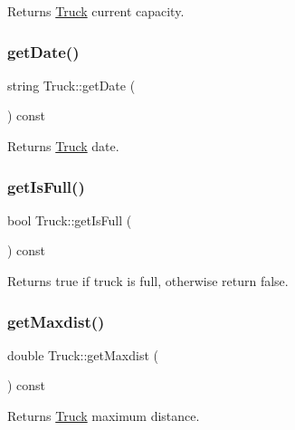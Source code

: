 \begin{DoxyReturn}{Returns}
\hyperlink{class_truck}{Truck} current capacity. 
\end{DoxyReturn}
\mbox{\label{class_truck_af27d980c66b104973ddac58ed64d3ddd}} 
\subsubsection{\texorpdfstring{get\+Date()}{getDate()}}
{\footnotesize\ttfamily string Truck\+::get\+Date (\begin{DoxyParamCaption}{ }\end{DoxyParamCaption}) const}

\begin{DoxyReturn}{Returns}
\hyperlink{class_truck}{Truck} date. 
\end{DoxyReturn}
\mbox{\label{class_truck_abc77aa027e9bd1c5bbaf0f35ed73d375}} 
\subsubsection{\texorpdfstring{get\+Is\+Full()}{getIsFull()}}
{\footnotesize\ttfamily bool Truck\+::get\+Is\+Full (\begin{DoxyParamCaption}{ }\end{DoxyParamCaption}) const}

\begin{DoxyReturn}{Returns}
true if truck is full, otherwise return false. 
\end{DoxyReturn}
\mbox{\label{class_truck_a89b2c4e211f4477caa7609b1f8622712}} 
\subsubsection{\texorpdfstring{get\+Maxdist()}{getMaxdist()}}
{\footnotesize\ttfamily double Truck\+::get\+Maxdist (\begin{DoxyParamCaption}{ }\end{DoxyParamCaption}) const}

\begin{DoxyReturn}{Returns}
\hyperlink{class_truck}{Truck} maximum distance. 
\end{DoxyReturn}
\mbox{\label{class_truck_ac463b5227326e17da5f9dc087425d618}} 

